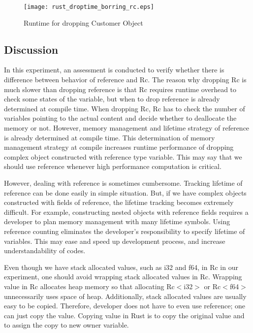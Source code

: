\begin{figure}[htb!]
    \texttt{[image: rust\_droptime\_borring\_rc.eps]}
    \caption{Runtime for dropping Customer Object}
    \label{fig:rc_ref}
\end{figure}


\subsection{Discussion}
In this experiment, an assessment is conducted to verify whether there is difference between behavior of reference and Rc.
The reason why dropping Rc is much slower than dropping reference is that Rc requires runtime overhead to check some states of the variable, 
but when to drop reference is already determined at compile time. When dropping Rc, Rc has to check the number of variables pointing to the actual content and decide 
whether to deallocate the memory or not. However, memory management and lifetime strategy of reference is already determined at compile time.
This determination of memory management strategy at compile increases runtime performance of dropping complex object constructed with reference type variable.
This may say that we should use reference whenever high performance computation is critical.

However, dealing with reference is sometimes cumbersome. Tracking lifetime of reference can be done easily in simple situation. 
But, if we have complex objects constructed with fields of reference, the lifetime tracking becomes extremely difficult. 
For example, constructing nested objects with reference fields requires a developer to plan memory management with many lifetime symbols. 
Using reference counting eliminates the developer's responsibility to specify lifetime of variables. 
This may ease and speed up development process, and increase understandability of codes.

Even though we have stack allocated values, such as i32 and f64, in Rc in our experiment, 
one should avoid wrapping stack allocated values in Rc. Wrapping value in Rc allocates heap memory so that allocating Rc$<$i32$>$ or Rc$<$f64$>$ unnecessarily uses space of 
heap. Additionally, stack allocated values are usually easy to be copied. Therefore, developer does not have to even use reference; one can just copy the value. 
Copying value in Rust is to copy the original value and to assign the copy to new owner variable. 